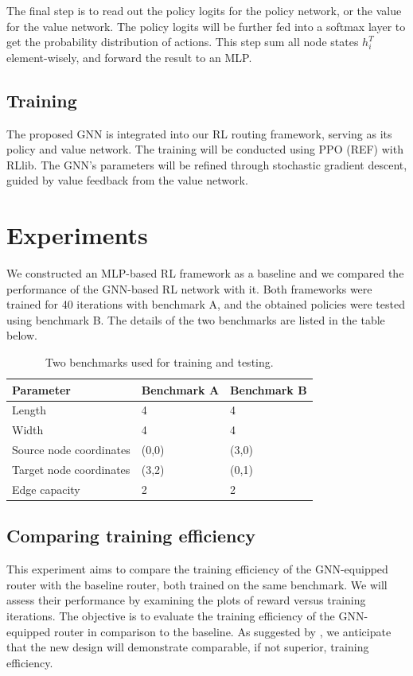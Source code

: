 \documentclass[letterpaper]{article}
\begin{document}
The final step is to read out the policy logits for the policy network, or the
value for the value network. The policy logits will be further fed into a
softmax layer to get the probability distribution of actions. This step sum all
node states $h_i^T$ element-wisely, and forward the result to an MLP.
\subsection{Training}
The proposed GNN is integrated into our RL routing framework, serving as its
policy and value network. The training will be conducted using PPO (REF) with
RLlib. The GNN's parameters will be refined through stochastic gradient descent,
guided by value feedback from the value network.

    
\section{Experiments}
We constructed an MLP-based RL framework as a baseline and we compared the performance of the GNN-based RL network with it. Both frameworks were trained for 40 iterations with benchmark A, and the obtained policies were tested using benchmark B. The details of the two benchmarks are listed in the table below.

\begin{table}[h!]
    \caption{Two benchmarks used for training and testing.}
    \centering
    \begin{tabularx}{\textwidth}{LLL}
        \toprule
        Parameter & Benchmark A & Benchmark B \\
        \midrule
        Length & 4 & 4 \\
        Width & 4 & 4 \\
        Source node coordinates & (0,0) & (3,0) \\
        Target node coordinates & (3,2) & (0,1) \\
        Edge capacity & 2 & 2 \\
        \bottomrule
    \end{tabularx}
\end{table}

\subsection{Comparing training efficiency}
This experiment aims to compare the training efficiency of the GNN-equipped
router with the baseline router, both trained on the same benchmark. We will
assess their performance by examining the plots of reward versus training
iterations. The objective is to evaluate the training efficiency of the
GNN-equipped router in comparison to the baseline. As suggested by
\cite{Wang2018}, we anticipate that the new design will demonstrate comparable,
if not superior, training efficiency.
\end{document}
